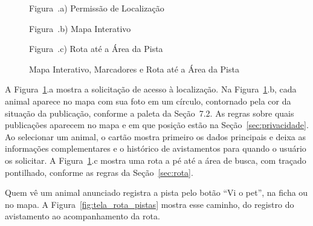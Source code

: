 \begin{figure}[H]
    \centering
    \caption{Mapa Interativo, Marcadores e Rota até a Área da Pista}
    \label{fig:tela_mapa}
    \vspace{0.15cm}
    \begin{minipage}[t]{0.31\textwidth}
        \centering
        \par\vspace{0.12cm}
        {\small Figura~\thefigure.a) Permissão de Localização}
    \end{minipage}
    \hfill
    \begin{minipage}[t]{0.31\textwidth}
        \centering
        \par\vspace{0.12cm}
        {\small Figura~\thefigure.b) Mapa Interativo}
    \end{minipage}
    \hfill
    \begin{minipage}[t]{0.31\textwidth}
        \centering
        \par\vspace{0.12cm}
        {\small Figura~\thefigure.c) Rota até a Área da Pista}
    \end{minipage}
    \par\vspace{0.12cm}
\end{figure}

A Figura~\ref{fig:tela_mapa}.a mostra a solicitação de acesso à localização. Na Figura~\ref{fig:tela_mapa}.b, cada animal aparece no mapa com sua foto em um círculo, contornado pela cor da situação da publicação, conforme a paleta da Seção~7.2. As regras sobre quais publicações aparecem no mapa e em que posição estão na Seção~\ref{sec:privacidade}. Ao selecionar um animal, o cartão mostra primeiro os dados principais e deixa as informações complementares e o histórico de avistamentos para quando o usuário os solicitar. A Figura~\ref{fig:tela_mapa}.c mostra uma rota a pé até a área de busca, com traçado pontilhado, conforme as regras da Seção~\ref{sec:rota}.

Quem vê um animal anunciado registra a pista pelo botão ``Vi o pet'', na ficha ou no mapa. A Figura~\ref{fig:tela_rota_pistas} mostra esse caminho, do registro do avistamento ao acompanhamento da rota.

